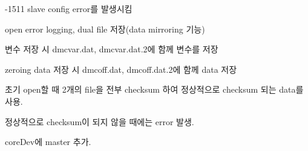 \begin{DoxyEnumerate}
\begin{DoxyItemize}
\item -\/1511 slave config error를 발생시킴
\end{DoxyItemize}
\item open error logging, dual file 저장(data mirroring 기능)
\begin{DoxyItemize}
\item 변수 저장 시 dmcvar.\-dat, dmcvar.\-dat.\-2에 함께 변수를 저장
\item zeroing data 저장 시 dmcoff.\-dat, dmcoff.\-dat.\-2에 함께 data 저장
\item 초기 open할 때 2개의 file을 전부 checksum 하여 정상적으로 checksum 되는 data를 사용.
\item 정상적으로 checksum이 되지 않을 때에는 error 발생.
\end{DoxyItemize}
\item core\-Dev에 master 추가. 
\end{DoxyEnumerate}